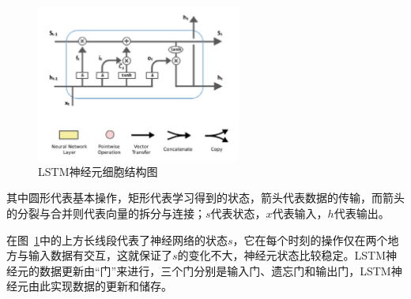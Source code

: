 \begin{figure}[!htb]
  \centering
  \includegraphics[width=0.6\textwidth]{figures/lstmc.png}
  \caption{LSTM神经元细胞结构图}
  \label{fig:lstmc}
\end{figure}
\hspace{-2em}其中圆形代表基本操作，矩形代表学习得到的状态，箭头代表数据的传输，而箭头的分裂与合并则代表向量的拆分与连接；$s$代表状态，$x$代表输入，$h$代表输出。

在图~\ref{fig:lstmc}中的上方长线段代表了神经网络的状态$s$，它在每个时刻的操作仅在两个地方与输入数据有交互，这就保证了$s$的变化不大，神经元状态比较稳定。LSTM神经元的数据更新由“门”来进行，三个门分别是输入门、遗忘门和输出门，LSTM神经元由此实现数据的更新和储存。

